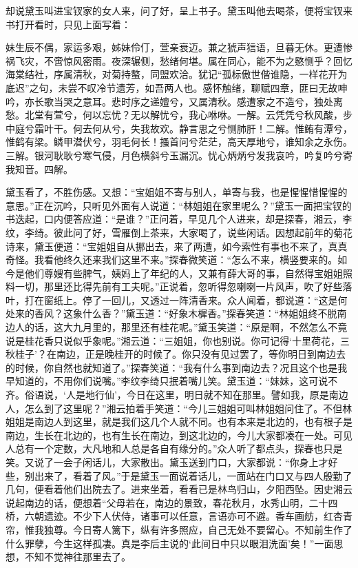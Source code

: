 


\begin{parag}
    却说黛玉叫进宝钗家的女人来，问了好，呈上书子。黛玉叫他去喝茶，便将宝钗来书打开看时，只见上面写着：
\end{parag}


\begin{qute2sp}
    妹生辰不偶，家运多艰，姊妹伶仃，萱亲衰迈。兼之猇声狺语，旦暮无休。更遭惨祸飞灾，不啻惊风密雨。夜深辗侧，愁绪何堪。属在同心，能不为之愍恻乎？回忆海棠结社，序属清秋，对菊持螯，同盟欢洽。犹记“孤标傲世偕谁隐，一样花开为底迟”之句，未尝不叹冷节遗芳，如吾两人也。感怀触绪，聊赋四章，匪曰无故呻吟，亦长歌当哭之意耳。悲时序之递嬗兮，又属清秋。感遭家之不造兮，独处离愁。北堂有萱兮，何以忘忧？无以解忧兮，我心咻咻。一解。云凭凭兮秋风酸，步中庭兮霜叶干。何去何从兮，失我故欢。静言思之兮恻肺肝！二解。惟鲔有潭兮，惟鹤有梁。鳞甲潜伏兮，羽毛何长！搔首问兮茫茫，高天厚地兮，谁知余之永伤。三解。银河耿耿兮寒气侵，月色横斜兮玉漏沉。忧心炳炳兮发我哀吟，吟复吟兮寄我知音。四解。
\end{qute2sp}


\begin{parag}
    黛玉看了，不胜伤感。又想：“宝姐姐不寄与别人，单寄与我，也是惺惺惜惺惺的意思。”正在沉吟，只听见外面有人说道：“林姐姐在家里呢么？”黛玉一面把宝钗的书迭起，口内便答应道：“是谁？”正问着，早见几个人进来，却是探春，湘云，李纹，李绮。彼此问了好，雪雁倒上茶来，大家喝了，说些闲话。因想起前年的菊花诗来，黛玉便道：“宝姐姐自从挪出去，来了两遭，如今索性有事也不来了，真真奇怪。我看他终久还来我们这里不来。”探春微笑道：“怎么不来，横竖要来的。如今是他们尊嫂有些脾气，姨妈上了年纪的人，又兼有薛大哥的事，自然得宝姐姐照料一切，那里还比得先前有工夫呢。”正说着，忽听得忽喇喇一片风声，吹了好些落叶，打在窗纸上。停了一回儿，又透过一阵清香来。众人闻着，都说道：“这是何处来的香风？这象什么香？”黛玉道：“好象木樨香。”探春笑道：“林姐姐终不脱南边人的话，这大九月里的，那里还有桂花呢。”黛玉笑道：“原是啊，不然怎么不竟说是桂花香只说似乎象呢。”湘云道：“三姐姐，你也别说。你可记得‘十里荷花，三秋桂子’？在南边，正是晚桂开的时候了。你只没有见过罢了，等你明日到南边去的时候，你自然也就知道了。”探春笑道：“我有什么事到南边去？况且这个也是我早知道的，不用你们说嘴。”李纹李绮只抿着嘴儿笑。黛玉道：“妹妹，这可说不齐。俗语说，‘人是地行仙’，今日在这里，明日就不知在那里。譬如我，原是南边人，怎么到了这里呢？”湘云拍着手笑道：“今儿三姐姐可叫林姐姐问住了。不但林姐姐是南边人到这里，就是我们这几个人就不同。也有本来是北边的，也有根子是南边，生长在北边的，也有生长在南边，到这北边的，今儿大家都凑在一处。可见人总有一个定数，大凡地和人总是各自有缘分的。”众人听了都点头，探春也只是笑。又说了一会子闲话儿，大家散出。黛玉送到门口，大家都说：“你身上才好些，别出来了，看着了风。”于是黛玉一面说着话儿，一面站在门口又与四人殷勤了几句，便看着他们出院去了。进来坐着，看看已是林鸟归山，夕阳西坠。因史湘云说起南边的话，便想着“父母若在，南边的景致，春花秋月，水秀山明，二十四桥，六朝遗迹。不少下人伏侍，诸事可以任意，言语亦可不避。香车画舫，红杏青帘，惟我独尊。今日寄人篱下，纵有许多照应，自己无处不要留心。不知前生作了什么罪孽，今生这样孤凄。真是李后主说的‘此间日中只以眼泪洗面’矣！”一面思想，不知不觉神往那里去了。
\end{parag}


